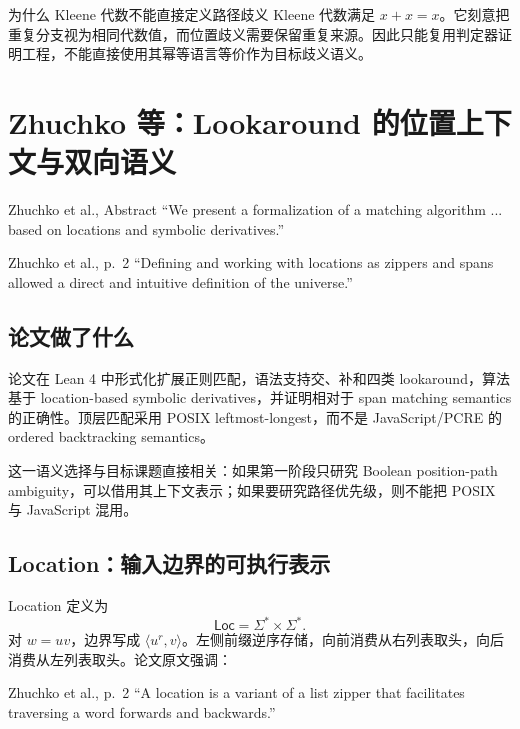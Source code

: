 \documentclass[UTF8,a4paper,12pt]{ctexart}
\begin{document}
\begin{boundarybox}{为什么 Kleene 代数不能直接定义路径歧义}
Kleene 代数满足 $x+x=x$。它刻意把重复分支视为相同代数值，而位置歧义需要保留重复来源。因此只能复用判定器证明工程，不能直接使用其幂等语言等价作为目标歧义语义。
\end{boundarybox}


\section{Zhuchko 等：Lookaround 的位置上下文与双向语义}

\begin{paperquote}{Zhuchko et al., Abstract}
``We present a formalization of a matching algorithm ... based on locations and symbolic derivatives.''
\end{paperquote}

\begin{paperquote}{Zhuchko et al., p.~2}
``Defining and working with locations as zippers and spans allowed a direct and intuitive definition of the universe.''
\end{paperquote}

\subsection{论文做了什么}

论文在 Lean 4 中形式化扩展正则匹配，语法支持交、补和四类 lookaround，算法基于 location-based symbolic derivatives，并证明相对于 span matching semantics 的正确性\cite[pp.~1--2]{zhuchko2024}。顶层匹配采用 POSIX leftmost-longest，而不是 JavaScript/PCRE 的 ordered backtracking semantics。

这一语义选择与目标课题直接相关：如果第一阶段只研究 Boolean position-path ambiguity，可以借用其上下文表示；如果要研究路径优先级，则不能把 POSIX 与 JavaScript 混用。

\subsection{Location：输入边界的可执行表示}

Location 定义为
\[
\mathsf{Loc}=\Sigma^*\times\Sigma^*.
\]
对 $w=uv$，边界写成 $\langle u^r,v\rangle$。左侧前缀逆序存储，向前消费从右列表取头，向后消费从左列表取头。论文原文强调：
\begin{paperquote}{Zhuchko et al., p.~2}
``A location is a variant of a list zipper that facilitates traversing a word forwards and backwards.''
\end{paperquote}
\end{document}
